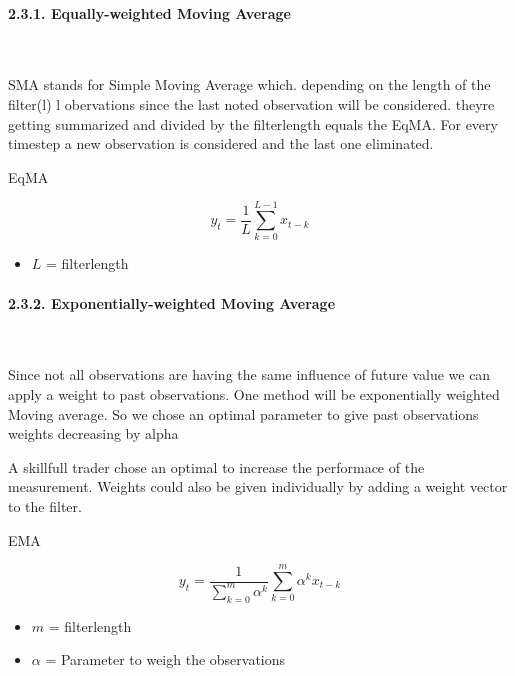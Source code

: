 \documentclass[
]{article}
\providecommand{\tightlist}{%
  \setlength{\itemsep}{0pt}\setlength{\parskip}{0pt}}
\begin{document}
\hypertarget{equally-weighted-moving-average}{%
\paragraph{2.3.1. Equally-weighted Moving
Average}\label{equally-weighted-moving-average}}

~

SMA stands for Simple Moving Average which. depending on the length of
the filter(l) l obervations since the last noted observation will be
considered. theyre getting summarized and divided by the filterlength
equals the EqMA. For every timestep a new observation is considered and
the last one eliminated.

EqMA

\begin{equation}
  \label{eq:eqma}
  y_{t}=\frac{1}{L}\sum_{k=0}^{L-1}x_{t-k}
\end{equation}

\begin{itemize}
\tightlist
\item
  \({L}\) = filterlength
\end{itemize}

\hypertarget{exponentially-weighted-moving-average}{%
\paragraph{2.3.2. Exponentially-weighted Moving
Average}\label{exponentially-weighted-moving-average}}

~

Since not all observations are having the same influence of future value
we can apply a weight to past observations. One method will be
exponentially weighted Moving average. So we chose an optimal parameter
to give past observations weights decreasing by alpha

A skillfull trader chose an optimal to increase the performace of the
measurement. Weights could also be given individually by adding a weight
vector to the filter.

EMA

\begin{equation}
  \label{eq:ema}
  y_{t}=\frac{1}{\sum_{k=0}^{m}\alpha^{k}}\sum_{k=0}^{m}\alpha^{k}x_{t-k}
\end{equation}

\begin{itemize}
\tightlist
\item
  \({m}\) = filterlength
\item
  \({\alpha}\) = Parameter to weigh the observations
\end{itemize}
\end{document}
